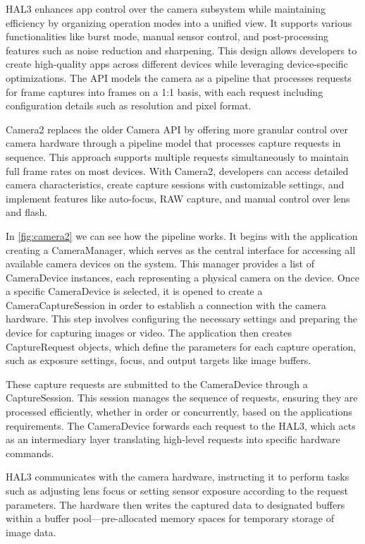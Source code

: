 HAL3 enhances app control over the camera subsystem while maintaining
efficiency by organizing operation modes into a unified view. It supports
various functionalities like burst mode, manual sensor control, and
post-processing features such as noise reduction and sharpening. This design
allows developers to create high-quality apps across different devices while
leveraging device-specific optimizations. The API models the camera as a
pipeline that processes requests for frame captures into frames on a 1:1 basis,
with each request including configuration details such as resolution and pixel
format.

Camera2 replaces the older Camera API by offering more granular control over
camera hardware through a pipeline model that processes capture requests in
sequence. This approach supports multiple requests simultaneously to maintain
full frame rates on most devices. With Camera2, developers can access detailed
camera characteristics, create capture sessions with customizable settings, and
implement features like auto-focus, RAW capture, and manual control over lens
and flash.

In \cref{fig:camera2} we can see how the pipeline works. It begins with the
application creating a CameraManager, which serves as the central interface for
accessing all available camera devices on the system. This manager provides a
list of CameraDevice instances, each representing a physical camera on the
device. Once a specific CameraDevice is selected, it is opened to create a
CameraCaptureSession in order to establish a connection with the camera
hardware. This step involves configuring the necessary settings and preparing
the device for capturing images or video. The application then creates
CaptureRequest objects, which define the parameters for each capture operation,
such as exposure settings, focus, and output targets like image buffers.

These capture requests are submitted to the CameraDevice through a
CaptureSession. This session manages the sequence of requests, ensuring they
are processed efficiently, whether in order or concurrently, based on the
applications requirements. The CameraDevice forwards each request to the HAL3,
which acts as an intermediary layer translating high-level requests into
specific hardware commands.

HAL3 communicates with the camera hardware, instructing it to perform tasks
such as adjusting lens focus or setting sensor exposure according to the
request parameters. The hardware then writes the captured data to designated
buffers within a buffer pool—pre-allocated memory spaces for temporary storage
of image data.

